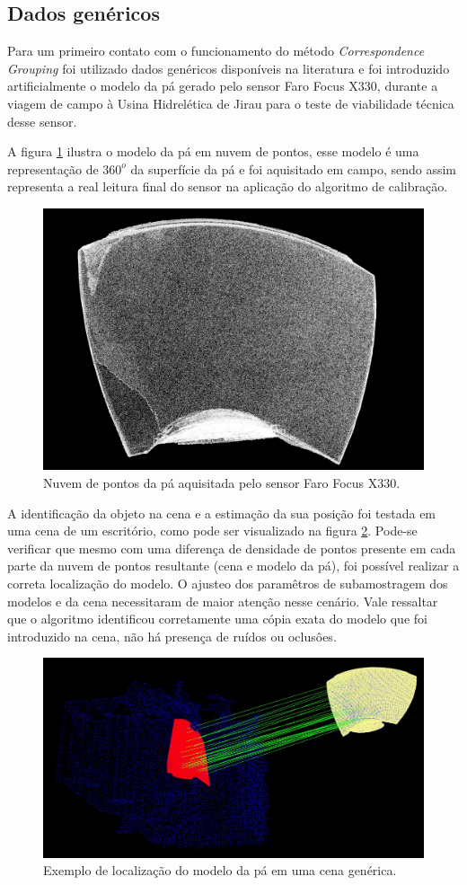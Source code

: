 \subsection{Dados genéricos}

Para um primeiro contato com o funcionamento do método \textit{Correspondence
Grouping} foi utilizado dados genéricos disponíveis na literatura e foi
introduzido artificialmente o modelo da pá gerado pelo sensor Faro Focus X330,
durante a viagem de campo à Usina Hidrelética de Jirau para o teste de
viabilidade técnica desse sensor. 

A figura \ref{fig::modelo_pa_faro} ilustra o modelo da pá em nuvem de pontos,
esse modelo é uma representação de $360^o$ da superfície da pá e foi aquisitado em
campo, sendo assim representa a real leitura final do sensor na aplicação do
algoritmo de calibração.

\begin{figure}[h!]
	\centering
	\includegraphics[width=0.6\columnwidth]{figs/calibracao/modelo_pa_faro}
	\caption{Nuvem de pontos da pá aquisitada pelo sensor Faro Focus X330.}
    \label{fig::modelo_pa_faro}
\end{figure}

A identificação da objeto na cena e a estimação da sua posição foi testada em
uma cena de um escritório, como pode ser visualizado na figura
\ref{fig::pa_cena_gen}. Pode-se verificar que mesmo com uma diferença de
densidade de pontos presente em cada parte da nuvem de pontos resultante (cena
e modelo da pá), foi possível realizar a correta localização do modelo. O
ajusteo dos paramêtros de subamostragem dos modelos e da cena necessitaram de
maior atenção nesse cenário. Vale ressaltar que o algoritmo identificou
corretamente uma cópia exata do modelo que foi introduzido na cena, não há
presença de ruídos ou oclusôes.

\begin{figure}[h!]
	\centering
	\includegraphics[width=0.6\columnwidth]{figs/calibracao/pa_cena_gen}
	\caption{Exemplo de localização do modelo da pá em uma cena genérica.}
    \label{fig::pa_cena_gen}
\end{figure}


